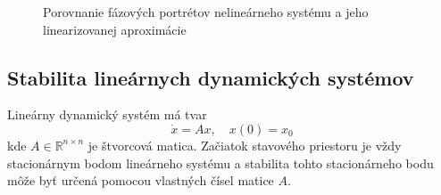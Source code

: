 \documentclass[a4paper, 10pt, ]{article}
\begin{document}









\begin{figure}[t]
	\centering


	\caption{Porovnanie fázových portrétov nelineárneho systému a jeho linearizovanej aproximácie}
	\label{Porovnanie fázových portrétov nelineárneho systému a jeho linearizovanej aproximácie}
\end{figure}













\subsection{Stabilita lineárnych dynamických systémov}


Lineárny dynamický systém má tvar
\begin{equation}
	\dot{x} = A x, \quad x(0) = x_0
\end{equation}
kde $A \in \mathbb{R}^{n\times n}$ je štvorcová matica. Začiatok stavového priestoru je vždy stacionárnym bodom lineárneho systému a stabilita tohto stacionárneho bodu môže byť určená pomocou vlastných čísel matice $A$.
\end{document}

